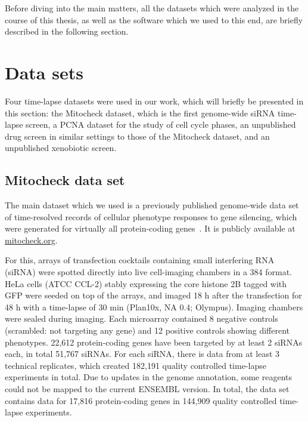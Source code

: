 Before diving into the main matters, all the datasets which were analyzed in the course of this thesis, as well as the software which we used to this end, are briefly described in the following section.
%
%
\section{Data sets}
Four time-lapse datasets were used in our work, which will briefly be presented in this section: the Mitocheck dataset, which is the first genome-wide siRNA time-lapse screen, a PCNA dataset for the study of cell cycle phases, an unpublished drug screen in similar settings to those of the Mitocheck dataset, and an unpublished xenobiotic screen.

\subsection{Mitocheck data set}
\label{sec:mito_prez}
The main dataset which we used is a previously published genome-wide data set of time-resolved
records of cellular phenotype responses to gene silencing, which
were generated for virtually all protein-coding genes~\cite{pmid20360735}. It is publicly available at
\href{http://www.mitocheck.org}{mitocheck.org}. 

For this, arrays of transfection cocktails containing small interfering RNA (siRNA) were spotted directly into live cell-imaging chambers in a 384 format. HeLa cells (ATCC\up{\textregistered} CCL-2\texttrademark) stably expressing the core histone 2B tagged with GFP were seeded on top of the arrays, and imaged 18 h after the transfection for 48 h with a time-lapse of 30 min (Plan10x, NA 0.4; Olympus). Imaging chambers were sealed during imaging. Each microarray contained 8 negative controls (scrambled: not targeting any gene) and 12 positive controls showing different phenotypes. 
22,612 protein-coding genes have been targeted by at least 2 siRNAs each, in total 51,767 siRNAs. For each siRNA, there is data from at least 3 technical replicates, which created 182,191 quality controlled time-lapse experiments in total. Due to updates in the genome annotation, some reagents could not be mapped to the current ENSEMBL version. In total, the data set contains data for 17,816 protein-coding genes in 144,909 quality controlled time-lapse
experiments.  


